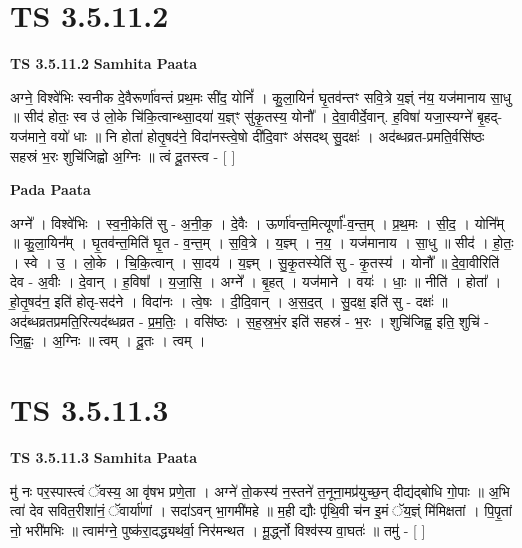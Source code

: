 \documentclass[17pt]{extarticle}
\begin{document}
\section{ TS 3.5.11.2 }

\textbf{TS 3.5.11.2 } \newline
\textbf{Samhita Paata} \newline

अग्ने॒ विश्वे॑भिः स्वनीक दे॒वैरूर्णा॑वन्तं प्रथ॒मः सी॑द॒ योनिं᳚ । कु॒ला॒यिनं॑ घृ॒तव॑न्तꣳ सवि॒त्रे य॒ज्ञ्ं न॑य॒ यज॑मानाय सा॒धु ॥ सीद॑ होतः॒ स्व उ॑ लो॒के चि॑कि॒त्वान्थ्सा॒दया॑ य॒ज्ञ्ꣳ सु॑कृ॒तस्य॒ योनौ᳚ । दे॒वा॒वीर्दे॒वान्. ह॒विषा॑ यजा॒स्यग्ने॑ बृ॒हद्-यज॑माने॒ वयो॑ धाः ॥ नि होता॑ होतृ॒षद॑ने॒ विदा॑नस्त्वे॒षो दी॑दि॒वाꣳ अ॑सदथ् सु॒दक्षः॑ । अद॑ब्धव्रत-प्रमति॒र्वसि॑ष्ठः सहस्रं भ॒रः शुचि॑जिह्वो अ॒ग्निः ॥ त्वं दू॒तस्त्व - [  ] \newline

\textbf{Pada Paata} \newline

अग्ने᳚ । विश्वे॑भिः । स्व॒नी॒केति॑ सु - अ॒नी॒क॒ । दे॒वैः । ऊर्णा॑वन्त॒मित्यूर्णा᳚-व॒न्त॒म् । प्र॒थ॒मः । सी॒द॒ । योनि᳚म् ॥ कु॒ला॒यिन᳚म् । घृ॒तव॑न्त॒मिति॑ घृ॒त - व॒न्त॒म् । स॒वि॒त्रे । य॒ज्ञ्म् । न॒य॒ । यज॑मानाय । सा॒धु ॥ सीद॑ । हो॒तः॒ । स्वे । उ॒ । लो॒के । चि॒कि॒त्वान् । सा॒दय॑ । य॒ज्ञ्म् । सु॒कृ॒तस्येति॑ सु - कृ॒तस्य॑ । योनौ᳚ ॥ दे॒वा॒वीरिति॑ देव - अ॒वीः । दे॒वान् । ह॒विषा᳚ । य॒जा॒सि॒ । अग्ने᳚ । बृ॒हत् । यज॑माने । वयः॑ । धाः॒ ॥ नीति॑ । होता᳚ । हो॒तृ॒षद॑न॒ इति॑ होतृ-सद॑ने । विदा॑नः । त्वे॒षः । दी॒दि॒वान् । अ॒स॒द॒त् । सु॒दक्ष॒ इति॑ सु - दक्षः॑ ॥ अद॑ब्धव्रतप्रमति॒रित्यद॑ब्धव्रत - प्र॒म॒तिः॒ । वसि॑ष्ठः । स॒ह॒स्र॒भं॒र इति॑ सहस्रं - भ॒रः । शुचि॑जिह्व॒ इति॒ शुचि॑ - जि॒ह्वः॒ । अ॒ग्निः ॥ त्वम् । दू॒तः । त्वम् ।  \newline





\section{ TS 3.5.11.3 }

\textbf{TS 3.5.11.3 } \newline
\textbf{Samhita Paata} \newline

मु॑ नः पर॒स्पास्त्वं ॅवस्य॒ आ वृ॑षभ प्रणे॒ता । अग्ने॑ तो॒कस्य॑ न॒स्तने॑ त॒नूना॒मप्र॑युच्छ॒न् दीद्य॑द्बोधि गो॒पाः ॥ अ॒भि त्वा॑ देव सवित॒रीशा॑नं॒ ॅवार्या॑णां । सदा॑ऽवन् भा॒गमी॑महे ॥ म॒ही द्यौः पृ॑थि॒वी च॑न इ॒मं ॅय॒ज्ञ्ं मि॑मिक्षतां । पि॒पृ॒तां नो॒ भरी॑मभिः ॥ त्वाम॑ग्ने॒ पुष्क॑रा॒दद्ध्यथ॑र्वा॒ निर॑मन्थत । मू॒र्द्ध्नो विश्व॑स्य वा॒घतः॑ ॥ तमु॑ - [  ] \newline
\end{document}
